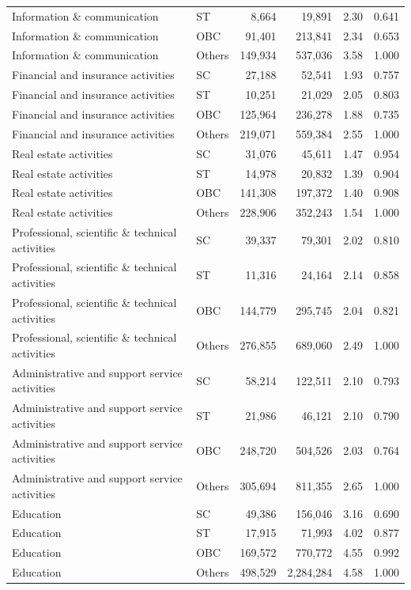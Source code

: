 \documentclass[11pt,a4paper]{report}
\begin{document}
\begin{longtable}{>{\raggedright\arraybackslash}p{5cm}lrrrr}
Information \& communication & ST & 8,664 & 19,891 & 2.30 & 0.641 \\
Information \& communication & OBC & 91,401 & 213,841 & 2.34 & 0.653 \\
Information \& communication & Others & 149,934 & 537,036 & 3.58 & 1.000 \\
Financial and insurance activities & SC & 27,188 & 52,541 & 1.93 & 0.757 \\
Financial and insurance activities & ST & 10,251 & 21,029 & 2.05 & 0.803 \\
Financial and insurance activities & OBC & 125,964 & 236,278 & 1.88 & 0.735 \\
Financial and insurance activities & Others & 219,071 & 559,384 & 2.55 & 1.000 \\
Real estate activities & SC & 31,076 & 45,611 & 1.47 & 0.954 \\
Real estate activities & ST & 14,978 & 20,832 & 1.39 & 0.904 \\
Real estate activities & OBC & 141,308 & 197,372 & 1.40 & 0.908 \\
Real estate activities & Others & 228,906 & 352,243 & 1.54 & 1.000 \\
Professional, scientific \& technical activities & SC & 39,337 & 79,301 & 2.02 & 0.810 \\
Professional, scientific \& technical activities & ST & 11,316 & 24,164 & 2.14 & 0.858 \\
Professional, scientific \& technical activities & OBC & 144,779 & 295,745 & 2.04 & 0.821 \\
Professional, scientific \& technical activities & Others & 276,855 & 689,060 & 2.49 & 1.000 \\
Administrative and support service activities & SC & 58,214 & 122,511 & 2.10 & 0.793 \\
Administrative and support service activities & ST & 21,986 & 46,121 & 2.10 & 0.790 \\
Administrative and support service activities & OBC & 248,720 & 504,526 & 2.03 & 0.764 \\
Administrative and support service activities & Others & 305,694 & 811,355 & 2.65 & 1.000 \\
Education & SC & 49,386 & 156,046 & 3.16 & 0.690 \\
Education & ST & 17,915 & 71,993 & 4.02 & 0.877 \\
Education & OBC & 169,572 & 770,772 & 4.55 & 0.992 \\
Education & Others & 498,529 & 2,284,284 & 4.58 & 1.000 \\

\end{longtable}
\end{document}
